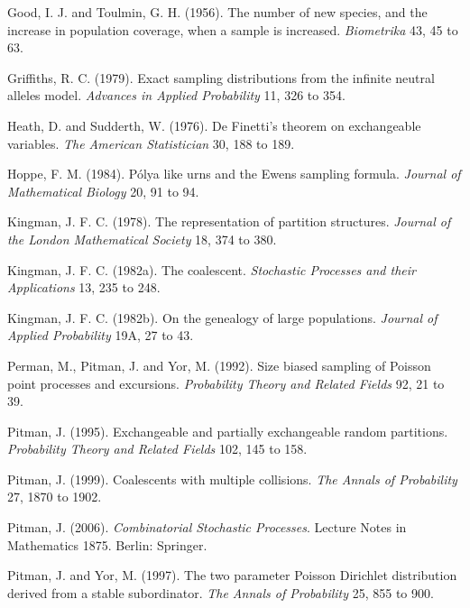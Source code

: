 \begin{thebibliography}{}
Good, I. J. and Toulmin, G. H. (1956). The number of new species, and the increase in
population coverage, when a sample is increased. \textit{Biometrika} 43, 45 to 63.

Griffiths, R. C. (1979). Exact sampling distributions from the infinite neutral
alleles model. \textit{Advances in Applied Probability} 11, 326 to 354.

Heath, D. and Sudderth, W. (1976). De Finetti's theorem on exchangeable variables.
\textit{The American Statistician} 30, 188 to 189.

Hoppe, F. M. (1984). P\'olya like urns and the Ewens sampling formula.
\textit{Journal of Mathematical Biology} 20, 91 to 94.

Kingman, J. F. C. (1978). The representation of partition structures.
\textit{Journal of the London Mathematical Society} 18, 374 to 380.

Kingman, J. F. C. (1982a). The coalescent. \textit{Stochastic Processes and their
Applications} 13, 235 to 248.

Kingman, J. F. C. (1982b). On the genealogy of large populations. \textit{Journal of
Applied Probability} 19A, 27 to 43.

Perman, M., Pitman, J. and Yor, M. (1992). Size biased sampling of Poisson point
processes and excursions. \textit{Probability Theory and Related Fields} 92, 21 to 39.

Pitman, J. (1995). Exchangeable and partially exchangeable random partitions.
\textit{Probability Theory and Related Fields} 102, 145 to 158.

Pitman, J. (1999). Coalescents with multiple collisions. \textit{The Annals of
Probability} 27, 1870 to 1902.

Pitman, J. (2006). \textit{Combinatorial Stochastic Processes}. Lecture Notes in
Mathematics 1875. Berlin: Springer.

Pitman, J. and Yor, M. (1997). The two parameter Poisson Dirichlet distribution
derived from a stable subordinator. \textit{The Annals of Probability} 25, 855 to 900.


\end{thebibliography}

